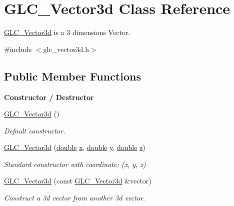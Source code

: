 \hypertarget{class_g_l_c___vector3d}{\section{G\-L\-C\-\_\-\-Vector3d Class Reference}
\label{class_g_l_c___vector3d}
}


\hyperlink{class_g_l_c___vector3d}{G\-L\-C\-\_\-\-Vector3d} is a 3 dimensions Vector.  




{\ttfamily \#include $<$glc\-\_\-vector3d.\-h$>$}

\subsection*{Public Member Functions}
\begin{Indent}{\bf Constructor / Destructor}\par
\begin{DoxyCompactItemize}
\item 
\hyperlink{class_g_l_c___vector3d_a7733c81ecf9fab77a0b95067a660d9e6}{G\-L\-C\-\_\-\-Vector3d} ()
\begin{DoxyCompactList}\small\item\em Default constructor. \end{DoxyCompactList}\item 
\hyperlink{class_g_l_c___vector3d_ade423d77761266cd4a4c31ff67eaf536}{G\-L\-C\-\_\-\-Vector3d} (\hyperlink{_super_l_u_support_8h_a8956b2b9f49bf918deed98379d159ca7}{double} \hyperlink{glext_8h_a1db9d104e3c2128177f26aff7b46982f}{x}, \hyperlink{_super_l_u_support_8h_a8956b2b9f49bf918deed98379d159ca7}{double} \hyperlink{glext_8h_a42315f3ed8fff752bb47fd782309fcfc}{y}, \hyperlink{_super_l_u_support_8h_a8956b2b9f49bf918deed98379d159ca7}{double} \hyperlink{glext_8h_a642c8d69fd1a54f255c898df4f0dd7ca}{z})
\begin{DoxyCompactList}\small\item\em Standard constructor with coordinate\-: (x, y, z) \end{DoxyCompactList}\item 
\hyperlink{class_g_l_c___vector3d_a9e0a029305cad594e0acd81df81e7c0b}{G\-L\-C\-\_\-\-Vector3d} (const \hyperlink{class_g_l_c___vector3d}{G\-L\-C\-\_\-\-Vector3d} \&vector)
\begin{DoxyCompactList}\small\item\em Construct a 3d vector from another 3d vector. \end{DoxyCompactList}\item 

\end{DoxyCompactItemize}
\end{Indent}
